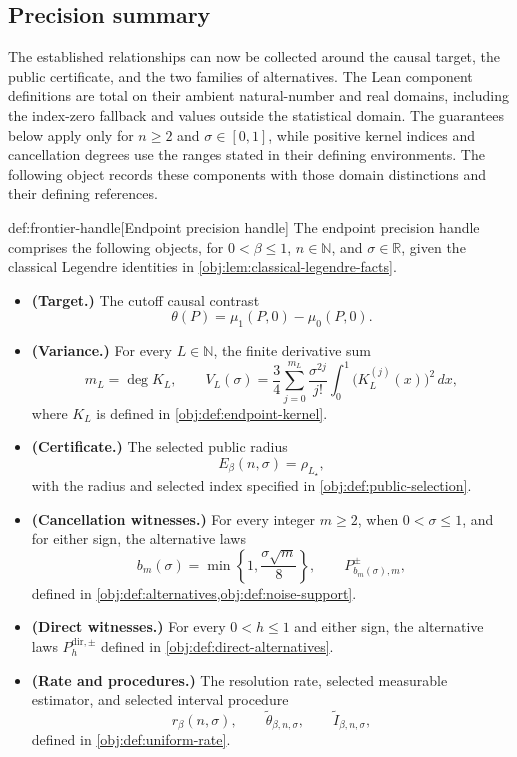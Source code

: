\subsection{Precision summary}

The established relationships can now be collected around the causal target, the public certificate, and the two families of alternatives. The Lean component definitions are total on their ambient natural-number and real domains, including the index-zero fallback and values outside the statistical domain. The guarantees below apply only for \(n\ge2\) and \(\sigma\in[0,1]\), while positive kernel indices and cancellation degrees use the ranges stated in their defining environments. The following object records these components with those domain distinctions and their defining references.

\begin{remarkv}{def:frontier-handle}[Endpoint precision handle]
The endpoint precision handle comprises the following objects, for \(0<\beta\le1\), \(n\in\mathbb N\), and \(\sigma\in\mathbb R\), given the classical Legendre identities in \cref{obj:lem:classical-legendre-facts}.
\begin{itemize}
\item \textbf{(Target.)} The cutoff causal contrast
\[
\theta(P)=\mu_1(P,0)-\mu_0(P,0).
\]
\item \textbf{(Variance.)} For every \(L\in\mathbb N\), the finite derivative sum
\[
m_L=\deg K_L,\qquad
V_L(\sigma)=\frac34\sum_{j=0}^{m_L}
\frac{\sigma^{2j}}{j!}
\int_0^1\bigl(K_L^{(j)}(x)\bigr)^2\,dx,
\]
where \(K_L\) is defined in \cref{obj:def:endpoint-kernel}.
\item \textbf{(Certificate.)} The selected public radius
\[
E_\beta(n,\sigma)=\rho_{L_\star},
\]
with the radius and selected index specified in \cref{obj:def:public-selection}.
\item \textbf{(Cancellation witnesses.)} For every integer \(m\ge2\), when \(0<\sigma\le1\), and for either sign, the alternative laws
\[
b_m(\sigma)=\min\left\{1,\frac{\sigma\sqrt m}{8}\right\},
\qquad
P^\pm_{b_m(\sigma),m},
\]
defined in \cref{obj:def:alternatives,obj:def:noise-support}.
\item \textbf{(Direct witnesses.)} For every \(0<h\le1\) and either sign, the alternative laws \(P_h^{\mathrm{dir},\pm}\) defined in \cref{obj:def:direct-alternatives}.
\item \textbf{(Rate and procedures.)} The resolution rate, selected measurable estimator, and selected interval procedure
\[
r_\beta(n,\sigma),\qquad
\widetilde\theta_{\beta,n,\sigma},\qquad
\widetilde I_{\beta,n,\sigma},
\]
defined in \cref{obj:def:uniform-rate}.
\end{itemize}
\end{remarkv}

